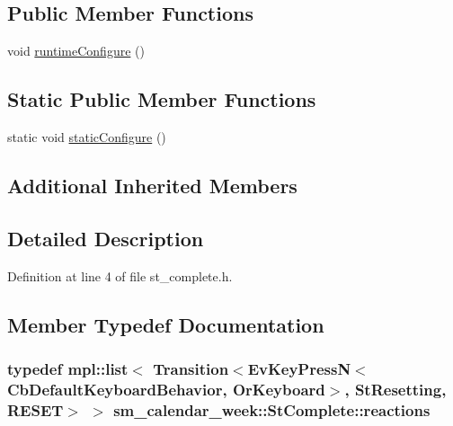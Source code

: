 \subsection*{Public Member Functions}
\begin{DoxyCompactItemize}
\item 
void \hyperlink{structsm__calendar__week_1_1StComplete_aa236f15bdfb04f4a5f7684c04a4cc8c2}{runtime\+Configure} ()
\end{DoxyCompactItemize}
\subsection*{Static Public Member Functions}
\begin{DoxyCompactItemize}
\item 
static void \hyperlink{structsm__calendar__week_1_1StComplete_ac9b6c92bf0cb78e57ac97415add4e52a}{static\+Configure} ()
\end{DoxyCompactItemize}
\subsection*{Additional Inherited Members}


\subsection{Detailed Description}


Definition at line 4 of file st\+\_\+complete.\+h.



\subsection{Member Typedef Documentation}
\subsubsection[{\texorpdfstring{reactions}{reactions}}]{\setlength{\rightskip}{0pt plus 5cm}typedef mpl\+::list$<$ Transition$<$Ev\+Key\+PressN$<$Cb\+Default\+Keyboard\+Behavior, {\bf Or\+Keyboard}$>$, {\bf St\+Resetting}, {\bf R\+E\+S\+ET}$>$ $>$ {\bf sm\+\_\+calendar\+\_\+week\+::\+St\+Complete\+::reactions}}\hypertarget{structsm__calendar__week_1_1StComplete_a6fb0af1c68075a3b6475ed252e6bfc4c}{}\label{structsm__calendar__week_1_1StComplete_a6fb0af1c68075a3b6475ed252e6bfc4c}


